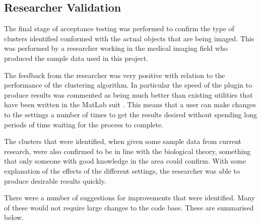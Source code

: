 \subsection{Researcher Validation}
\label{sub:researcher_validation}

The final stage of acceptance testing was performed to confirm the type of
clusters identified conformed with the actual objects that are being imaged.
This was performed by a researcher working in the medical imaging field who
produced the sample data used in this project.

The feedback from the researcher was very positive with relation to the
performance of the clustering algorithm. In particular the speed of the plugin
to produce results was commented as being much better than existing utilities
that have been written in the MatLab suit \cite{matlab2010}. This means that a
user can make changes to the settings a number of times to get the results
desired without spending long periods of time waiting for the process to
complete.

The clusters that were identified, when given some sample data from current
research, were also confirmed to be in line with the biological theory,
something that only someone with good knowledge in the area could confirm. With
some explanation of the effects of the different settings, the researcher was
able to produce desirable results quickly.

There were a number of suggestions for improvements that were identified. Many
of these would not require large changes to the code base. These are summarised
below.

